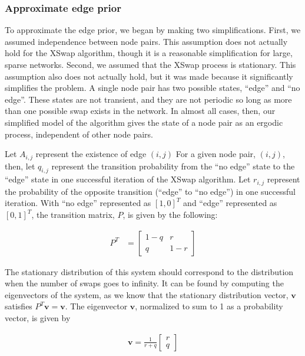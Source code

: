 \hypertarget{approx-prior-supp}{%
\subsubsection{Approximate edge prior}\label{approx-prior-supp}}

To approximate the edge prior, we began by making two simplifications.
First, we assumed independence between node pairs.
This assumption does not actually hold for the XSwap algorithm, though it is a reasonable simplification for large, sparse networks.
Second, we assumed that the XSwap process is stationary.
This assumption also does not actually hold, but it was made because it significantly simplifies the problem.
A single node pair has two possible states, ``edge'' and ``no edge''.
These states are not transient, and they are not periodic so long as more than one possible swap exists in the network.
In almost all cases, then, our simplified model of the algorithm gives the state of a node pair as an ergodic process, independent of other node pairs.

Let \(A_{i,j}\) represent the existence of edge \((i, j)\)
For a given node pair, \((i, j)\), then, let \(q_{i,j}\) represent the transition probability from the ``no edge'' state to the ``edge'' state in one successful iteration of the XSwap algorithm.
Let \(r_{i,j}\) represent the probability of the opposite transition (``edge'' to ``no edge'') in one successful iteration.
With ``no edge'' represented as \([1, 0]^T\) and ``edge'' represented as \([0, 1]^T\), the transition matrix, \(P\), is given by the following:

\begin{align*}
    P^T &= \begin{bmatrix}
       1-q & r \\
       q & 1-r
     \end{bmatrix}
\end{align*}

The stationary distribution of this system should correspond to the distribution when the number of swaps goes to infinity.
It can be found by computing the eigenvectors of the system, as we know that the stationary distribution vector, \(\mathbf{v}\) satisfies \(P^T \mathbf{v} = \mathbf{v}\).
The eigenvector \(\mathbf{v}\), normalized to sum to 1 as a probability vector, is given by

\begin{align*}
    \mathbf{v} = \frac{1}{r + q} \begin{bmatrix}
        r \\
        q
    \end{bmatrix}
\end{align*}

